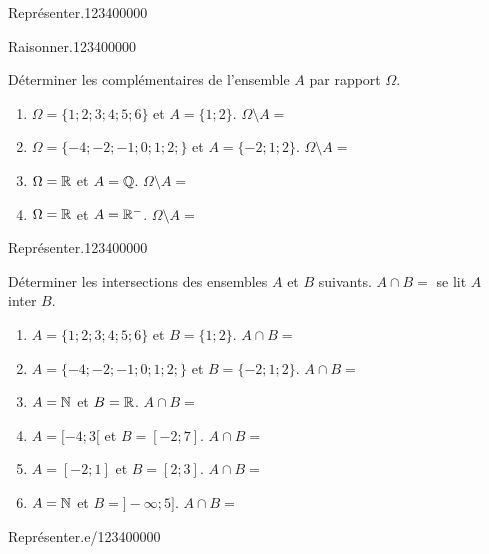 \begin{pageAD}
\begin{ExoCad}{Représenter.}{1234}{0}{0}{0}{0}{0}
\end{ExoCad}




\begin{ExoCad}{Raisonner.}{1234}{0}{0}{0}{0}{0}

Déterminer les complémentaires de l'ensemble $A$ par rapport $\Omega$. 
\begin{enumerate}
\item $\Omega = \lbrace 1;2;3;4;5;6\rbrace$ et $A = \lbrace 1;2 \rbrace$. $\Omega \setminus A = $
\item $\Omega = \lbrace -4;-2;-1;0;1;2;\rbrace$ et $A = \lbrace -2;1;2 \rbrace$.  $\Omega \setminus A = $
\item $\Omega = \mathbb R$ et $A = \mathbb Q$. $\Omega \setminus A = $
\item $\Omega = \mathbb R$ et $A = \mathbb R^-$. $\Omega \setminus A = $
\end{enumerate} 
 \end{ExoCad}


\begin{ExoCad}{Représenter.}{1234}{0}{0}{0}{0}{0}

Déterminer les intersections des ensembles $A$ et $B$ suivants.   $A \cap B = $ se lit $A$ inter $B$.
\begin{enumerate}
\item $A = \lbrace 1;2;3;4;5;6\rbrace$ et $B = \lbrace 1;2 \rbrace$. $A \cap B = $
\item $A = \lbrace -4;-2;-1;0;1;2;\rbrace$ et $B = \lbrace -2;1;2 \rbrace$.  $A \cap B = $
\item $A = \mathbb N$ et $B = \mathbb R$. $A \cap B = $ 
\item $A = [-4;3[$ et $B =[-2;7]$. $A \cap B = $ 
\item $A = [-2;1]$ et $B =[2;3]$. $A \cap B = $ 
\item $A = \mathbb N$ et $B =]-\infty;5]$. $A \cap B = $ 
\end{enumerate}
 
\end{ExoCad}









\begin{ExoCad}{Représenter.}{e/1234}{0}{0}{0}{0}{0}


\end{ExoCad}
\end{pageAD}

